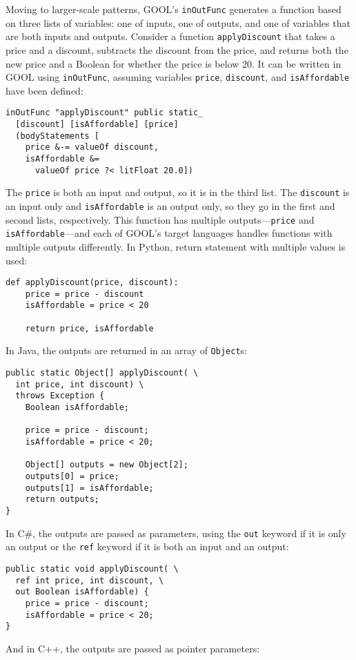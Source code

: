 \documentclass[sigplan,review,anonymous,prologue,dvipsnames]{acmart}
\begin{document}
Moving to larger-scale patterns, GOOL's \verb|inOutFunc| generates a function  
based on three lists of variables: one of inputs, one of outputs, and one of 
variables that are both inputs and outputs. Consider a function 
\verb|applyDiscount| that takes a price and a discount, subtracts the discount 
from the price, and returns both the new price and a Boolean for whether the 
price is below 20. It can be written in GOOL using \verb|inOutFunc|, assuming 
variables \verb|price|, \verb|discount|, and \verb|isAffordable| have been 
defined:
\begin{lstlisting}
inOutFunc "applyDiscount" public static_
  [discount] [isAffordable] [price]
  (bodyStatements [
    price &-= valueOf discount,
    isAffordable &= 
      valueOf price ?< litFloat 20.0])
\end{lstlisting}
The \verb|price| is both an input and output, so it is in the third list. The 
\verb|discount| is an input only and \verb|isAffordable| is an output only, so 
they go in the first and second lists, respectively. This function has multiple 
outputs---\verb|price| and \verb|isAffordable|---and each of GOOL's target 
languages handles functions with multiple outputs differently. In Python, 
return statement with multiple values is used:
\begin{lstlisting}
def applyDiscount(price, discount):
    price = price - discount
    isAffordable = price < 20

    return price, isAffordable
\end{lstlisting}
In Java, the outputs are returned in an array of \verb|Object|s:
\begin{lstlisting}
public static Object[] applyDiscount( \
  int price, int discount) \
  throws Exception {
    Boolean isAffordable;

    price = price - discount;
    isAffordable = price < 20;

    Object[] outputs = new Object[2];
    outputs[0] = price;
    outputs[1] = isAffordable;
    return outputs;
}
\end{lstlisting}
In C\#, the outputs are passed as parameters, using the \verb|out| keyword if
it is only an output or the \verb|ref| keyword if it is both an input and an
output:
\begin{lstlisting}
public static void applyDiscount( \
  ref int price, int discount, \
  out Boolean isAffordable) {
    price = price - discount;
    isAffordable = price < 20;
}
\end{lstlisting}
And in C++, the outputs are passed as pointer parameters:
\end{document}
